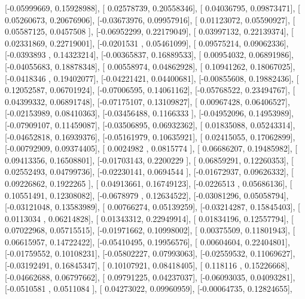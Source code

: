 \documentclass{article}
\begin{document}
       [-0.05999669,  0.15928988],
       [ 0.02578739,  0.20558346],
       [ 0.04036795,  0.09873471],
       [ 0.05260673,  0.20676906],
       [-0.03673976,  0.09957916],
       [ 0.01123072,  0.05590927],
       [ 0.05587125,  0.0457508 ],
       [-0.06952299,  0.22179049],
       [ 0.03997132,  0.22139374],
       [ 0.02331869,  0.22719001],
       [-0.0201531 ,  0.05461099],
       [ 0.09575214,  0.09062336],
       [-0.0393893 ,  0.14323214],
       [-0.00365837,  0.16889533],
       [ 0.00954032,  0.06891986],
       [-0.04055683,  0.18878348],
       [ 0.00558974,  0.04862928],
       [ 0.10941262,  0.18067025],
       [-0.0418346 ,  0.19402077],
       [-0.04221421,  0.04400681],
       [-0.00855608,  0.19882436],
       [ 0.12052587,  0.06701924],
       [-0.07006595,  0.14061162],
       [-0.05768522,  0.23494767],
       [ 0.04399332,  0.06891748],
       [-0.07175107,  0.13109827],
       [ 0.00967428,  0.06406527],
       [-0.02153989,  0.08410363],
       [-0.03456488,  0.1166333 ],
       [-0.04952096,  0.14953989],
       [-0.07909107,  0.11459087],
       [-0.03506895,  0.06932362],
       [ 0.01835088,  0.05243314],
       [-0.04652818,  0.16939376],
       [-0.05161979,  0.10635921],
       [ 0.02415055,  0.17062899],
       [-0.00792909,  0.09374405],
       [ 0.0024982 ,  0.0815774 ],
       [ 0.06686207,  0.19485982],
       [ 0.09413356,  0.16508801],
       [-0.01703143,  0.2200229 ],
       [ 0.06859291,  0.12260353],
       [ 0.02552493,  0.04799736],
       [-0.02230141,  0.0694544 ],
       [-0.01672937,  0.09626332],
       [ 0.09226862,  0.1922265 ],
       [ 0.04913661,  0.16749123],
       [-0.0226513 ,  0.05686136],
       [ 0.10551491,  0.12308082],
       [-0.0678979 ,  0.12634522],
       [-0.03081296,  0.05058794],
       [-0.03121048,  0.13583989],
       [ 0.00766274,  0.05139259],
       [-0.03214287,  0.15845403],
       [ 0.0113034 ,  0.06214828],
       [ 0.01343312,  0.22949914],
       [ 0.01834196,  0.12557794],
       [ 0.07022968,  0.05715515],
       [-0.01971662,  0.10998002],
       [ 0.00375509,  0.11801943],
       [ 0.06615957,  0.14722422],
       [-0.05410495,  0.19956576],
       [ 0.00604604,  0.22404801],
       [-0.01759552,  0.10108231],
       [-0.05802227,  0.07993063],
       [-0.02559532,  0.11069627],
       [-0.03192491,  0.16845347],
       [ 0.10107921,  0.08418405],
       [ 0.118116  ,  0.15226668],
       [-0.04662688,  0.06797662],
       [ 0.09791225,  0.04237037],
       [-0.06093035,  0.04093281],
       [-0.0510581 ,  0.0511084 ],
       [ 0.04273022,  0.09960959],
       [-0.00064735,  0.12824655],
\end{document}
